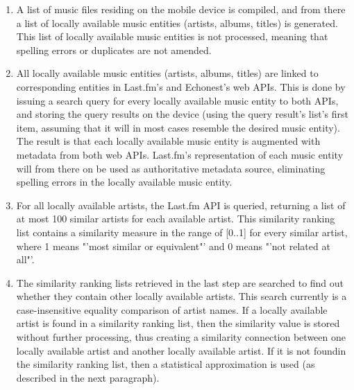 \begin{enumerate}
	\item A list of music files residing on the mobile device is compiled, and from there a list of locally available music entities (artists, albums, titles) is generated. This list of locally available music entities is not processed, meaning that spelling errors or duplicates are not amended.
	\item All locally available music entities (artists, albums, titles) are linked to corresponding entities in Last.fm's and Echonest's web APIs. This is done by issuing a search query for every locally available music entity to both APIs, and storing the query results on the device (using the query result's list's first item, assuming that it will in most cases resemble the desired music entity). The result is that each locally available music entity is augmented with metadata from both web APIs. Last.fm's representation of each music entity will from there on be used as authoritative metadata source, eliminating spelling errors in the locally available music entity.
	\item For all locally available artists, the Last.fm API is queried, returning a list of at most 100 similar artists for each available artist. This similarity ranking list contains a similarity measure in the range of [0..1] for every similar artist, where 1 means "'most similar or equivalent"' and 0 means "'not related at all"'.
	\item The similarity ranking lists retrieved in the last step are searched to find out whether they contain other locally available artists. This search currently is a case-insensitive equality comparison of artist names. If a locally available artist is found in a similarity ranking list, then the similarity value is stored without further processing, thus creating a similarity connection between one locally available artist and another locally available artist. If it is not foundin the similarity ranking list, then a statistical approximation is used (as described in the next paragraph).
\end{enumerate}

